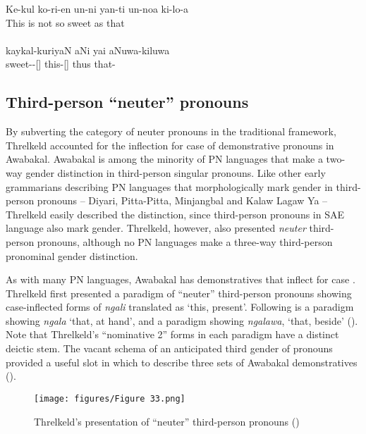 \ea\label{ex:3:19}
Ke-kul ko-ri-en un-ni yan-ti un-noa ki-lo-a \\
\glt This is not so sweet as that \\
\citep[17]{threlkeld_australian_1834} \\
\gll kaykal-kuriyaN aNi yai aNuwa-kiluwa \\
sweet--[] this-[] thus that- \\
\glt \citep[62]{lissarrague_salvage_2006} 
\z

\subsection{Third-person “neuter” pronouns}
\label{sec:key:3.3.2.1}

By subverting the category of neuter pronouns in the traditional framework, Threlkeld accounted for the inflection for case of demonstrative pronouns in Awabakal. Awabakal is among the minority of PN languages that make a two-way gender distinction in third-person singular pronouns. Like other early grammarians describing PN languages that morphologically mark gender in third-person pronouns – Diyari, Pitta-Pitta, Minjangbal and Kalaw Lagaw Ya – Threlkeld easily described the distinction, since third-person pronouns in SAE language also mark gender. Threlkeld, however, also presented \textit{neuter} third-person pronouns, although no PN languages make a three-way third-person pronominal gender distinction.

As with many PN languages, Awabakal has demonstratives that inflect for case \citep[335]{dixon_australian_2002}. Threlkeld first presented a paradigm of “neuter” third-person pronouns showing case-inflected forms of \textit{ngali} translated as `this, present'. Following is a paradigm showing \textit{ngala} `that, at hand', and a paradigm showing \textit{ngalawa}, `that, beside' (). Note that Threlkeld’s “nominative 2” forms in each paradigm have a distinct deictic stem. The vacant schema of an anticipated third gender of pronouns provided a useful slot in which to describe three sets of Awabakal demonstratives (\citealt[34--36]{lissarrague_salvage_2006}).

\begin{figure}
\texttt{[image: figures/Figure 33.png]}
\caption{\label{fig:3:33} Threlkeld’s presentation of “neuter” third-person pronouns (\citeyear[22]{threlkeld_australian_1834})}
\end{figure}


